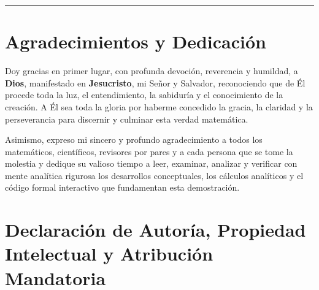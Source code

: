 \documentclass[11pt,a4paper]{article}
\theoremstyle{definition}
\theoremstyle{remark}
\begin{document}
\tableofcontents

\vspace{1.5em}
\hrule
\vspace{1.5em}

\section*{Agradecimientos y Dedicación}

Doy gracias en primer lugar, con profunda devoción, reverencia y humildad, a \textbf{Dios}, manifestado en \textbf{Jesucristo}, mi Señor y Salvador, reconociendo que de Él procede toda la luz, el entendimiento, la sabiduría y el conocimiento de la creación. A Él sea toda la gloria por haberme concedido la gracia, la claridad y la perseverancia para discernir y culminar esta verdad matemática.

Asimismo, expreso mi sincero y profundo agradecimiento a todos los matemáticos, científicos, revisores por pares y a cada persona que se tome la molestia y dedique su valioso tiempo a leer, examinar, analizar y verificar con mente analítica rigurosa los desarrollos conceptuales, los cálculos analíticos y el código formal interactivo que fundamentan esta demostración.

\vspace{1.5em}

\section*{Declaración de Autoría, Propiedad Intelectual y Atribución Mandatoria}
\end{document}
